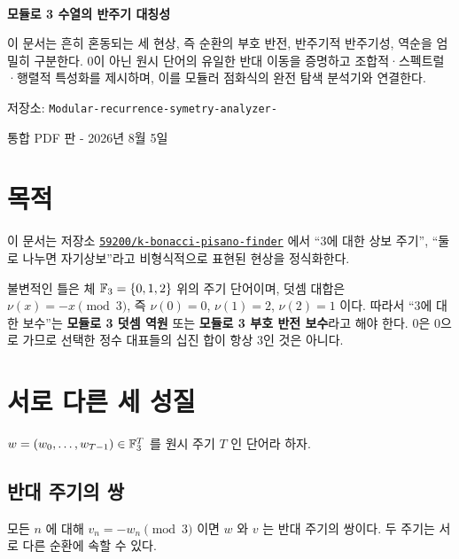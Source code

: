 \documentclass[11pt,a4paper]{article}
\begin{document}
\begin{titlepage}\thispagestyle{empty}\vspace*{22mm}{\color{accent}\rule{\textwidth}{1.2pt}}\\[15mm]{\fontsize{27}{33}\selectfont\bfseries\color{ink}모듈로 3 수열의 반주기 대칭성\par}\vspace{13mm}\begin{summarybox}이 문서는 흔히 혼동되는 세 현상, 즉 순환의 부호 반전, 반주기적 반주기성, 역순을 엄밀히 구분한다. 0이 아닌 원시 단어의 유일한 반대 이동을 증명하고 조합적·스펙트럴·행렬적 특성화를 제시하며, 이를 모듈러 점화식의 완전 탐색 분석기와 연결한다.\end{summarybox}\vfill{\large\color{muted}저장소: \texttt{Modular-recurrence-symetry-analyzer-}\par}{\large\color{muted}통합 PDF 판 - 2026년 8월 5일\par}\vspace{12mm}{\color{accent}\rule{\textwidth}{1.2pt}}\end{titlepage}
\renewcommand{\contentsname}{목차}\tableofcontents\clearpage
\section{목적}
이 문서는 저장소 \href{https://github.com/59200/k-bonacci-pisano-finder}{\texttt{59200/k-bonacci-pisano-finder}} 에서 “3에 대한 상보 주기”, “둘로 나누면 자기상보”라고 비형식적으로 표현된 현상을 정식화한다.

불변적인 틀은 체 \(\mathbb F_3=\{0,1,2\}\) 위의 주기 단어이며, 덧셈 대합은 \(\nu(x)=-x\pmod3\), 즉 \(\nu(0)=0\), \(\nu(1)=2\), \(\nu(2)=1\) 이다. 따라서 “3에 대한 보수”는 \textbf{모듈로 3 덧셈 역원} 또는 \textbf{모듈로 3 부호 반전 보수}라고 해야 한다. 0은 0으로 가므로 선택한 정수 대표들의 십진 합이 항상 3인 것은 아니다.
\section{서로 다른 세 성질}
\(w=(w_0,\ldots,w_{T-1})\in\mathbb F_3^T\) 를 원시 주기 \(T\) 인 단어라 하자.
\subsection{반대 주기의 쌍}
모든 \(n\) 에 대해 \(v_n=-w_n\pmod3\) 이면 \(w\) 와 \(v\) 는 반대 주기의 쌍이다. 두 주기는 서로 다른 순환에 속할 수 있다.
\end{document}
